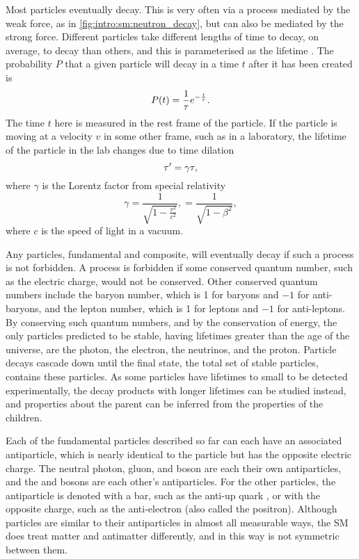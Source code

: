 
Most particles eventually decay.
This is very often via a process mediated by the weak force, as in 
\cref{fig:intro:sm:neutron_decay}, but can also be mediated by the strong 
force.
Different particles take different lengths of time to decay, on average, to 
decay than others, and this is parameterised as the lifetime \lifetime.
The probability $P$ that a given particle will decay in a time $t$ after it has 
been created is
\begin{equation}
  P(t) = \frac{1}{\tau}e^{-\frac{t}{\tau}}.
  \label{eqn:intro:sm:lifetime}
\end{equation}
The time $t$ here is measured in the rest frame of the particle.
If the particle is moving at a velocity $v$ in some other frame, such as in a 
laboratory, the lifetime of the particle in the lab changes due to time 
dilation
\begin{equation}
  \tau' = \gamma\tau,
  \label{eqn:intro:sm:lifetime_lab}
\end{equation}
where $\gamma$ is the Lorentz factor from special relativity
\begin{equation}
  \gamma = \frac{1}{\sqrt{1 - \frac{v^{2}}{c^{2}}}},
         = \frac{1}{\sqrt{1 - \beta^{2}}},
  \label{eqn:intro:sm:lorentz_factor}
\end{equation}
where $c$ is the speed of light in a vacuum.

Any particles, fundamental and composite, will eventually decay if such a 
process is not forbidden.
A process is forbidden if some conserved quantum number, such as the electric 
charge, would not be conserved.
Other conserved quantum numbers include the baryon number, which is 1 for 
baryons and $-1$ for anti-baryons, and the lepton number, which is 1 for 
leptons and $-1$ for anti-leptons.
By conserving such quantum numbers, and by the conservation of energy, the only 
particles predicted to be stable, having lifetimes greater than the age of the 
universe, are the photon, the electron, the neutrinos, and the proton.
Particle decays cascade down until the final state, the total set of stable 
particles, contains these particles.
As some particles have lifetimes to small to be detected experimentally, the 
decay products with longer lifetimes can be studied instead, and properties 
about the parent can be inferred from the properties of the children.

Each of the fundamental particles described so far can each have an associated 
antiparticle, which is nearly identical to the particle but has the opposite 
electric charge.
The neutral photon, gluon, and \PZ boson are each their own antiparticles, and 
the \PWp and \PWm bosons are each other's antiparticles.
For the other particles, the antiparticle is denoted with a bar, such as the 
anti-up quark \APup, or with the opposite charge, such as the anti-electron 
\APelectron (also called the positron).
Although particles are similar to their antiparticles in almost all measurable 
ways, the \ac{SM} does treat matter and antimatter differently, and in this way 
is not symmetric between them.

